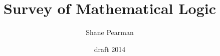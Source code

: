 \documentclass{article}
\begin{document}
\setcounter{secnumdepth}{5}
\setcounter{tocdepth}{5}


\title{Survey of Mathematical Logic}
\date{draft 2014}
\author{Shane Pearman}
\maketitle


\tableofcontents


\pagebreak[4]
\pagebreak[4]
\pagebreak[4]
\pagebreak[4]
\pagebreak[4]

\pagebreak[4]
\pagebreak[4]
\pagebreak[4]
\pagebreak[4]

\pagebreak[4]
\pagebreak[4]
\pagebreak[4]

\pagebreak[4]
\pagebreak[4]
\pagebreak[4]

\pagebreak[4]
\pagebreak[4]

\pagebreak[4]
\pagebreak[4]
\pagebreak[4]
\end{document}
